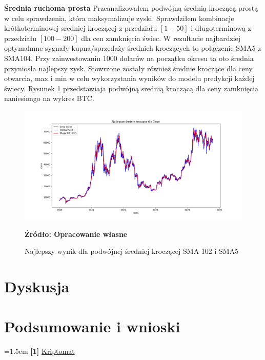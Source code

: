 \documentclass[12pt,a4paper,twoside, inzynierska]{pwr_wmat_praca_dyplomowa}
\theoremstyle{plain}
\numberwithin{theorem}{chapter}
\theoremstyle{definition}
\numberwithin{theorem}{chapter}
\begin{document}
	\textbf{Średnia ruchoma prosta}
	Przeanalizowałem podwójną średnią kroczącą prostą w celu sprawdzenia, która maksymalizuje zyski. Sprawdziłem kombinacje krótkoterminowej sredniej kroczącej z przedziału $[1-50]$ i długoterminową z przedziału $[100-200]$ dla cen zamknięcia świec. W rezultacie najbardziej optymalnme sygnały kupna/sprzedaży średnich kroczących to połączenie SMA5 z SMA104. Przy zainwestowaniu 1000 dolarów na początku okresu ta oto średnia przyniosła najlepszy zysk. Stowrzone zostały również średnie kroczące dla ceny otwarcia, max i min w celu wykorzystania wyników do modelu predykcji każdej świecy. Rysunek \ref{fig:SMA} przedstawiaja podwójną srednią kroczącą dla ceny zamknięcia naniesiongo na wykres BTC. 
	\vspace{12pt}
	\begin{figure}[H]
		\centering
		\includegraphics[width=1 \textwidth]{Najlepszy wynik dla 2 srednich kroczacych SMA 102 i 5.png}
		\caption{Najlepszy wynik dla podwójnej średniej kroczącej SMA 102 i SMA5}
		\label{fig:SMA}
		\textbf{Źródło: Opracowanie własne} \\
	\end{figure}
	\vspace{12pt}

	
	
	
	
	
	
	
	
	
	
	
	
	
	\vspace{12pt}
	\chapter{Dyskusja}
	\chapter{Podsumowanie i wnioski}
	
	
	\appendix
\hangindent=1.5em
\noindent \textbf{[1]} \href{https://kriptomat.io/pl/finanse-i-inwestycje/jakie-sa-kluczowe-elementy-analizy-fundamentalnej-w-handlu-kryptowalutami/}{Kriptomat} \newline
\end{document}
